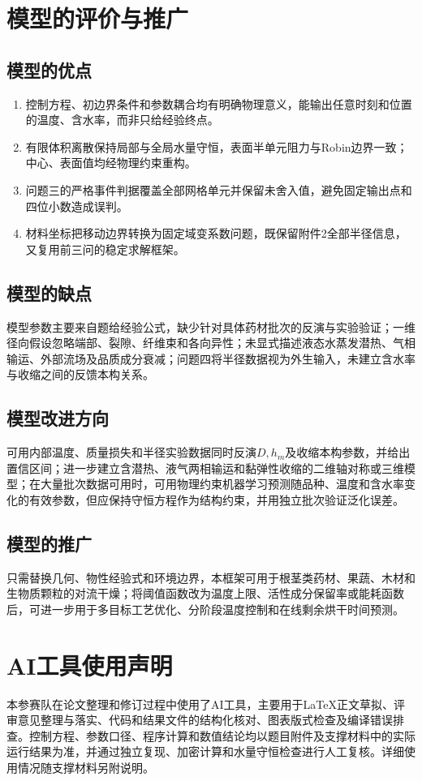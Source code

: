 \documentclass[UTF8,a4paper,zihao=-4,fontset=fandol]{ctexart}
\begin{document}
\section{模型的评价与推广}
\subsection{模型的优点}
\begin{enumerate}
  \item 控制方程、初边界条件和参数耦合均有明确物理意义，能输出任意时刻和位置的温度、含水率，而非只给经验终点。
  \item 有限体积离散保持局部与全局水量守恒，表面半单元阻力与Robin边界一致；中心、表面值均经物理约束重构。
  \item 问题三的严格事件判据覆盖全部网格单元并保留未舍入值，避免固定输出点和四位小数造成误判。
  \item 材料坐标把移动边界转换为固定域变系数问题，既保留附件2全部半径信息，又复用前三问的稳定求解框架。
\end{enumerate}
\subsection{模型的缺点}
模型参数主要来自题给经验公式，缺少针对具体药材批次的反演与实验验证；一维径向假设忽略端部、裂隙、纤维束和各向异性；未显式描述液态水蒸发潜热、气相输运、外部流场及品质成分衰减；问题四将半径数据视为外生输入，未建立含水率与收缩之间的反馈本构关系。
\subsection{模型改进方向}
可用内部温度、质量损失和半径实验数据同时反演$D,h_m$及收缩本构参数，并给出置信区间；进一步建立含潜热、液气两相输运和黏弹性收缩的二维轴对称或三维模型；在大量批次数据可用时，可用物理约束机器学习预测随品种、温度和含水率变化的有效参数，但应保持守恒方程作为结构约束，并用独立批次验证泛化误差。
\subsection{模型的推广}
只需替换几何、物性经验式和环境边界，本框架可用于根茎类药材、果蔬、木材和生物质颗粒的对流干燥；将阈值函数改为温度上限、活性成分保留率或能耗函数后，可进一步用于多目标工艺优化、分阶段温度控制和在线剩余烘干时间预测。

\section*{AI工具使用声明}
本参赛队在论文整理和修订过程中使用了AI工具，主要用于LaTeX正文草拟、评审意见整理与落实、代码和结果文件的结构化核对、图表版式检查及编译错误排查。控制方程、参数口径、程序计算和数值结论均以题目附件及支撑材料中的实际运行结果为准，并通过独立复现、加密计算和水量守恒检查进行人工复核。详细使用情况随支撑材料另附说明。
\end{document}
